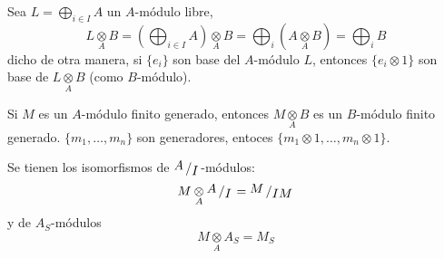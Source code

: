 Sea $\displaystyle L=\bigoplus_{i \in I} A$ un $A$-m\'odulo libre,
$$L \underset{A}{\otimes} B = \left(\bigoplus_{i \in I} A\right) \underset{A}{\otimes} B = \bigoplus_i (A \underset{A}{\otimes} B) =   \bigoplus_i B $$
dicho de otra manera, si $\{e_i\}$ son base del $A$-m\'odulo $L$, entonces $\{e_i\otimes 1\}$ son base de $L \underset{A}{\otimes} B$ (como $B$-m\'odulo). 

Si $M$ es un $A$-m\'odulo finito generado, entonces $M\underset{A}{\otimes}B$ es un $B$-m\'odulo finito generado. $\{m_1, \ldots, m_n\}$ son generadores, entoces $\{m_1\otimes1, \ldots, m_n\otimes 1\}$.

Se tienen los isomorfismos de $\modulo{A}{I}$-m\'odulos:
$$M \underset{A}{\otimes} \modulo{A}{I} = \modulo{M}{IM}$$
y de $A_S$-m\'odulos
$$M \underset{A}{\otimes} A_S = M_S$$

